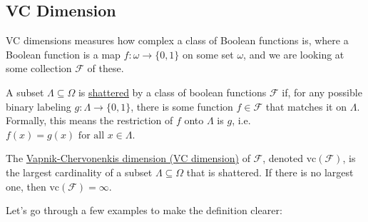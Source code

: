 \subsection{VC Dimension}
VC dimensions measures how complex a class of Boolean functions is, where a Boolean function is a map 
$f: \omega \to \{0, 1\}$ on some set $\omega$, and we are looking at some collection $\mathcal{F}$ of these.

\begin{definition}[]
\label{def:8.3.1}
A subset $\Lambda \subseteq \Omega$ is \underline{shattered} by a class of boolean functions $\mathcal{F}$ if, 
for any possible binary labeling $g: \Lambda \to \{0, 1\}$, there is some function $f \in \mathcal{F}$ that 
matches it on $\Lambda$. Formally, this means the restriction of $f$ onto $\Lambda$ is $g$, i.e. 
$f(x) = g(x) \text{ for all } x \in \Lambda$.

The \underline{Vapnik-Chervonenkis dimension (VC dimension)} of $\mathcal{F}$, denoted 
$\mathrm{vc}(\mathcal{F})$, is the largest cardinality of a subset $\Lambda \subseteq \Omega$ that is shattered. 
If there is no largest one, then $\mathrm{vc}(\mathcal{F}) = \infty$.
\end{definition}

Let's go through a few examples to make the definition clearer:

